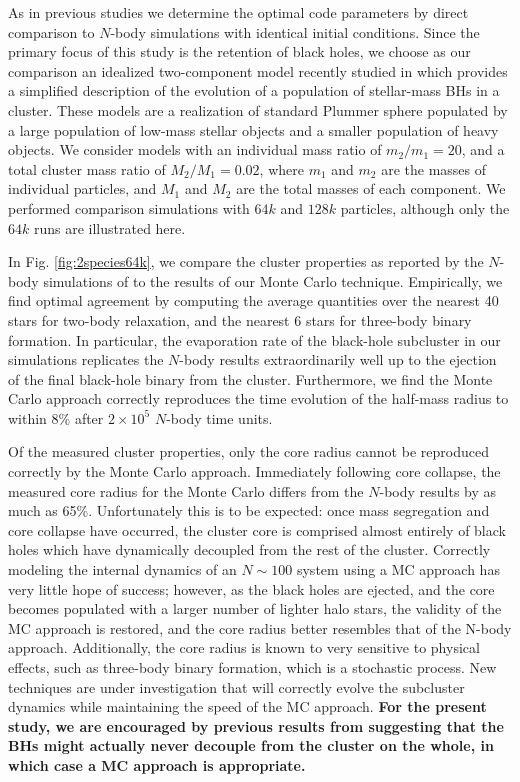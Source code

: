 \documentclass[12pt,preprint]{aastex}
\begin{document}
As in previous studies \citep{Joshi2000} we determine the optimal code
parameters by direct comparison to $N$-body simulations with identical initial
conditions.  Since the primary focus of this study is the retention of black holes,
we choose as our comparison an idealized two-component model recently studied 
in \cite{Breen2013} which provides a simplified description of the evolution of a population
of stellar-mass BHs in a cluster. These models are a realization of standard Plummer
sphere populated by a large population of low-mass stellar objects and a smaller
population of heavy objects.  We consider models with an individual mass ratio of
$m_2/m_1 = 20$, and a total cluster mass ratio of $M_2/M_1 = 0.02$, where $m_1$
and $m_2$ are the masses of individual particles, and $M_1$ and $M_2$ are the
total masses of each component.  We performed comparison simulations with $64k$ 
and $128k$ particles, although only the $64k$ runs are illustrated here.

In Fig. \ref{fig:2species64k}, we compare the cluster properties as reported by
the $N$-body simulations of \cite{Breen2013} to the results of our Monte
Carlo technique.  Empirically, we find optimal agreement by computing the
average quantities over the nearest 40 stars for two-body relaxation, and the
nearest 6 stars for three-body binary formation.  In particular, the 
evaporation rate of the black-hole subcluster in our simulations replicates
the $N$-body results extraordinarily well up to the ejection of the final
black-hole binary from the cluster.  Furthermore, we find the Monte Carlo
approach correctly reproduces the time evolution of the half-mass radius
to within 8\% after $2\times10^5$ $N$-body time units.  

Of the measured cluster properties, only the core radius cannot be
reproduced correctly by the Monte Carlo approach.  Immediately following core
collapse, the measured core radius for the Monte Carlo differs from the $N$-body
results by as much as 65\%.  Unfortunately this is to be expected: once mass
segregation and core collapse have occurred, the cluster core is comprised almost
entirely of black holes which have dynamically decoupled from the rest of the
cluster.  Correctly modeling the internal dynamics of an $N\sim100$ system using
a MC approach has very little hope of success; however, as the black holes are
ejected, and the core becomes populated with a larger number of lighter halo
stars, the validity of the MC approach is restored, and the core
radius better resembles that of the N-body approach.  Additionally, the core radius
is known to very sensitive to physical effects, such as three-body binary formation,
which is a stochastic process. New techniques are under
investigation that will correctly evolve the subcluster dynamics while
maintaining the speed of the MC approach. \textbf{For the present study,
we are encouraged by previous results from \cite{Morscher2013} suggesting
 that the BHs might actually never decouple from the cluster on the whole, 
 in which case a MC approach is appropriate.}
\end{document}
